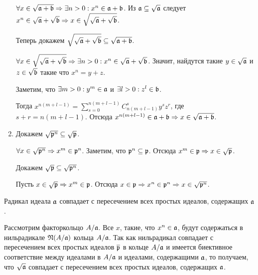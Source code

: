 \begin{Proof}
\begin{enumerate}
                $\forall x \in \sqrt{\mathfrak{a} + \mathfrak{b}} \Rightarrow \exists n > 0 : x^n \in \mathfrak{a} + \mathfrak{b}$. 
                Из $\mathfrak{a} \subseteq \sqrt{\mathfrak{a}}$ следует \newline $x^n \in \sqrt{\mathfrak{a}} + \sqrt{\mathfrak{b}} \Rightarrow x \in \sqrt{\sqrt{\mathfrak{a}} + \sqrt{\mathfrak{b}} }$.

                Теперь докажем $\sqrt{\sqrt{\mathfrak{a}} + \sqrt{\mathfrak{b}}} \subseteq \sqrt{\mathfrak{a} + \mathfrak{b}}$.

                $\forall x \in \sqrt{\sqrt{\mathfrak{a}} + \sqrt{\mathfrak{b}}} \Rightarrow \exists n > 0 : x^n \in \sqrt{\mathfrak{a}} + \sqrt{\mathfrak{b}}$. 
                Значит, найдутся такие $y \in \sqrt{\mathfrak{a}}$ и $z \in \sqrt{\mathfrak{b}}$ такие что $x^n = y + z$. 
                
                Заметим, что $\exists m > 0 : y^m \in \mathfrak{a}$ и $\exists l > 0 : z^l \in \mathfrak{b}$.

                Тогда $x^{n(m + l - 1)} = \sum_{s = 0}^{n(m + l - 1)} C_{n(m + l - 1)}^s y^sz^r$, где $s + r = n(m + l - 1)$. Отсюда 
                $x^{n(m + l - 1)}  \in \mathfrak{a} + \mathfrak{b} \Rightarrow x \in \sqrt{\mathfrak{a} + \mathfrak{b}}$.
            \item Докажем $\sqrt{\mathfrak{p}^n} \subseteq \sqrt{\mathfrak{p}}$.
            
                $\forall x \in \sqrt{\mathfrak{p}^n} \Rightarrow x^m \in \mathfrak{p}^n$. Заметим, что $\mathfrak{p}^n \subseteq \mathfrak{p}$. 
                Отсюда $x^m \in \mathfrak{p} \Rightarrow x \in \sqrt{\mathfrak{p}}$.

                Докажем $\sqrt{\mathfrak{p}} \subseteq \sqrt{\mathfrak{p}^n}$. 
                
                Пусть $x \in \sqrt{\mathfrak{p}} \Rightarrow x^m \in \mathfrak{p}$. Отсюда $x \in \mathfrak{p} \Rightarrow x^n \in \mathfrak{p}^n \Rightarrow x \in \sqrt{\mathfrak{p}^n}$.
        \end{enumerate}
    \end{Proof}

    \begin{Theorem} {\cite{A-M}}
        Радикал идеала $\mathfrak{a}$ совпадает с пересечением всех простых идеалов, содержащих $\mathfrak{a}$.
    \end{Theorem}
    \begin{Proof}
        Рассмотрим факторкольцо $A/\mathfrak{a}$. Все $x$, такие, что $x^n \in \mathfrak{a}$, будут содержаться в нильрадикале
        $\mathfrak{N}(A/\mathfrak{a})$ кольца $A/\mathfrak{a}$. Так как нильрадикал совпадает с пересечением всех простых идеалов $\overline{\mathfrak{p}}$
        в кольце $A/\mathfrak{a}$ и имеется биективное соответствие между идеалами в $A/\mathfrak{a}$ и идеалами, содержащими $\mathfrak{a}$, 
        то получаем, что $\sqrt{\mathfrak{a}}$ совпадает с пересечением всех простых идеалов, содержащих $\mathfrak{a}$.
    \end{Proof}
